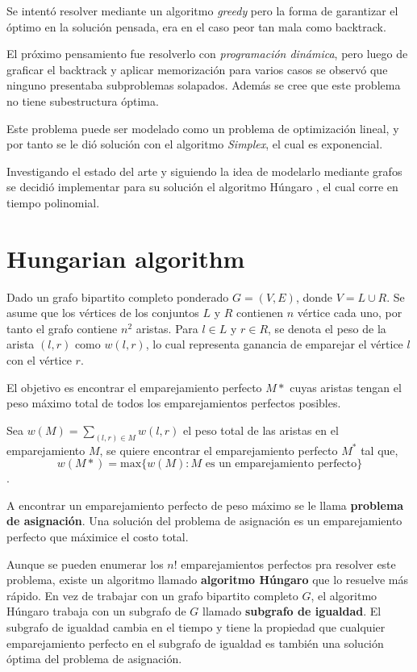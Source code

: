 \documentclass[10pt]{article} %
\begin{document}
	Se intent\'o resolver mediante un algoritmo \textit{greedy} pero la  forma de garantizar el \'optimo en la soluci\'on pensada, era en el caso peor tan mala como backtrack.
	
	El pr\'oximo pensamiento fue resolverlo con \textit{programaci\'on din\'amica}, pero luego de graficar el backtrack y aplicar memorizaci\'on para varios casos se observ\'o que ninguno presentaba subproblemas solapados. Adem\'as se cree que este problema no tiene subestructura \'optima.
	
	Este problema puede ser modelado como un problema de optimizaci\'on lineal, y por tanto se le di\'o soluci\'on con el algoritmo \textit{Simplex}, el cual es exponencial.
	
	
	Investigando el estado del arte y siguiendo la idea de modelarlo mediante grafos se decidi\'o implementar para su soluci\'on el algoritmo H\'ungaro \cite{introduction}, el cual corre en tiempo polinomial.
	
	\section{Hungarian algorithm}
	Dado un grafo bipartito completo ponderado $G = (V,E)$, donde $V = L \cup R$. Se asume que los v\'ertices de los conjuntos $L$ y $R$ contienen $n$ v\'ertice cada uno, por tanto el grafo contiene $n^2$ aristas. Para $l \in L$ y $r \in R$, se denota el peso de la arista $(l,r)$ como $w(l,r)$, lo cual representa ganancia de emparejar el v\'ertice $l$ con el v\'ertice $r$.
	
	El objetivo es encontrar el emparejamiento perfecto $M*$ cuyas aristas tengan el peso m\'aximo total de todos los emparejamientos perfectos posibles. 
	
	Sea $w(M) = \sum_{(l,r) \in M} w(l,r)$ el peso total de las aristas en el emparejamiento $M$, se quiere encontrar el emparejamiento perfecto $M^*$ tal que,
	\[w(M*)=\text{max}\{w(M):M \text{ es un emparejamiento perfecto}\}\].
	
	A encontrar un emparejamiento perfecto de peso m\'aximo se le llama \textbf{problema de asignaci\'on}. Una soluci\'on del problema de asignaci\'on es un emparejamiento perfecto que m\'aximice el costo total.
	
	Aunque se pueden enumerar los $n!$ emparejamientos perfectos pra resolver este problema, existe un algoritmo llamado \textbf{algoritmo H\'ungaro} que lo resuelve m\'as r\'apido. En vez de trabajar con un grafo bipartito completo $G$, el algoritmo H\'ungaro trabaja con un subgrafo de $G$ llamado \textbf{subgrafo de igualdad}. El subgrafo de igualdad cambia en el tiempo y tiene la propiedad que cualquier emparejamiento perfecto en el subgrafo de igualdad es tambi\'en una soluci\'on \'optima del problema de asignaci\'on.
	
\end{document}
